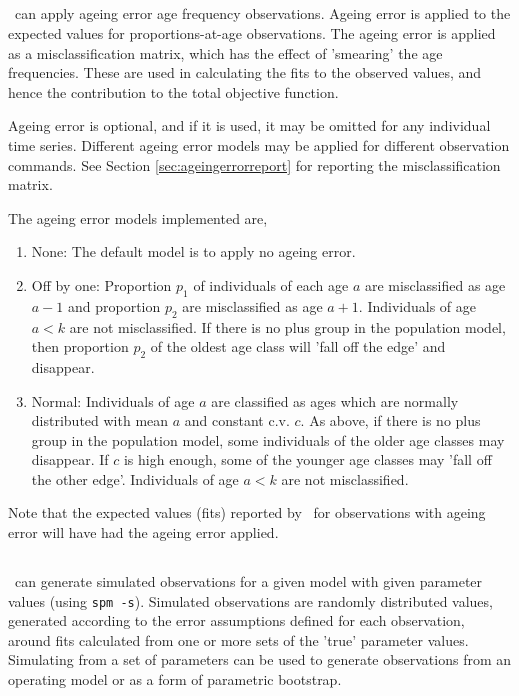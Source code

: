 {{{{{{\subsection{}

\SPM\ can apply ageing error age frequency observations. Ageing error is applied to the expected values for proportions-at-age observations. The ageing error is applied as a misclassification matrix, which has the effect of 'smearing' the age frequencies. These are used in calculating the fits to the observed values, and hence the contribution to the total objective function. 

Ageing error is optional, and if it is used, it may be omitted for any individual time series. Different ageing error models may be applied for different observation commands. See Section \ref{sec:ageingerrorreport} for reporting the misclassification matrix.

The ageing error models implemented are,
\begin{enumerate}
  \item{None}: The default model is to apply no ageing error.
  \item{Off by one}: Proportion $p_1$ of individuals of each age $a$ are misclassified as age $a-1$ and proportion $p_2$ are misclassified as age $a+1$. Individuals of age $a < k$ are not misclassified. If there is no plus group in the population model, then proportion $p_2$ of the oldest age class will 'fall off the edge' and disappear. 
  \item{Normal}: Individuals of age $a$ are classified as ages which are normally distributed with mean $a$ and constant c.v. $c$. As above, if there is no plus group in the population model, some individuals of the older age classes may disappear. If $c$ is high enough, some of the younger age classes may 'fall off the other edge'. Individuals of age $a < k$ are not misclassified.
\end{enumerate}

Note that the expected values (fits) reported by \SPM\ for observations with ageing error will have had the ageing error applied. 

\subsection{\label{sec:simulation-observations}}

\SPM\ can generate simulated observations for a given model with given parameter values (using \texttt{spm -s}). Simulated observations are randomly distributed values, generated according to the error assumptions defined for each observation, around fits calculated from one or more sets of the 'true' parameter values. Simulating from a set of parameters can be used to generate observations from an operating model or as a form of parametric bootstrap. 

}}}}}}
